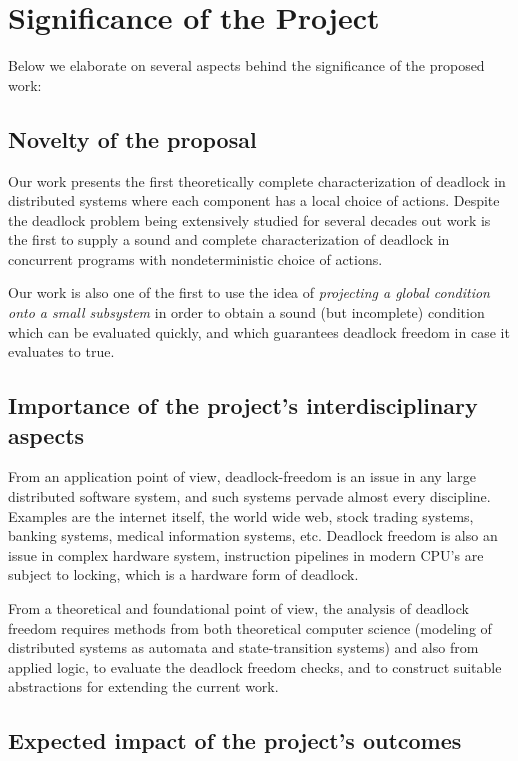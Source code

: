 \section{Significance of the Project}

Below we elaborate on several aspects behind the significance of the proposed work:


\subsection{Novelty of the proposal}

Our work presents the first theoretically complete characterization of deadlock
in distributed systems where each component has a local choice of actions.
Despite the deadlock problem being extensively studied for several decades \cite{Kn87}
out work is the first to supply a sound and complete characterization of
deadlock in concurrent programs with nondeterministic choice of actions.

Our work is also one of the first to use the idea of \emph{projecting a global condition
onto a small subsystem} in order to obtain a sound (but incomplete) condition
which can be evaluated quickly, and which guarantees deadlock freedom in case it
evaluates to true.



\subsection{Importance of the project's interdisciplinary aspects}

From an application point of view, 
deadlock-freedom is an issue in any large distributed software system, and such
systems pervade almost every discipline. Examples are the internet itself, the
world wide web, stock trading systems, banking systems, medical information
systems, etc.
Deadlock freedom is also an issue in complex hardware system, \eg
instruction pipelines in modern CPU's are subject to locking, which is a hardware
form of deadlock.

From a theoretical and foundational point of view, the analysis of deadlock
freedom requires methods from both theoretical computer science (modeling of
distributed systems as automata and state-transition systems) and also from
applied logic, to evaluate the deadlock freedom checks, and to construct
suitable abstractions for extending the current work.




\subsection{Expected impact of the project's outcomes}

